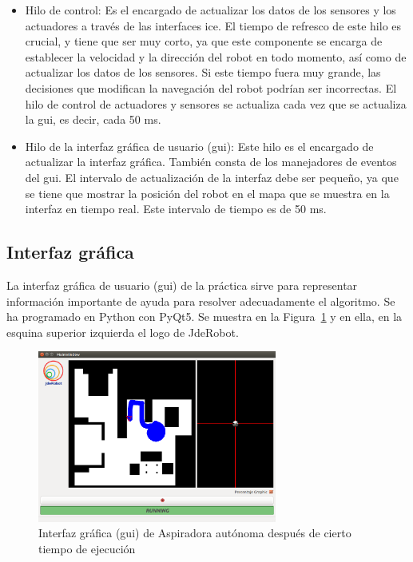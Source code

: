 \begin{itemize}
\item Hilo de control: Es el encargado de actualizar los datos de los sensores y los actuadores a través de las interfaces \acrshort{ice}. El tiempo de refresco de este hilo es crucial, y tiene que ser muy corto, ya que este componente se encarga de establecer la velocidad y la dirección del robot en todo momento, así como de actualizar los datos de los sensores. Si este tiempo fuera muy grande, las decisiones que modifican la navegación del robot podrían ser incorrectas. El hilo de control de actuadores y sensores se actualiza cada vez que se actualiza la \acrshort{gui}, es decir, cada 50 ms.

\item	Hilo de la interfaz gráfica de usuario (\acrshort{gui}): Este hilo es el encargado de actualizar la interfaz gráfica. También consta de los manejadores de eventos del \acrshort{gui}. El intervalo de actualización de la interfaz debe ser pequeño, ya que se tiene que mostrar la posición del robot en el mapa que se muestra en la interfaz en tiempo real. Este intervalo de tiempo es de 50 ms.

\end{itemize}


\subsection{Interfaz gráfica}
La interfaz gráfica de usuario (\acrshort{gui}) de la práctica sirve para representar información importante de ayuda para resolver adecuadamente el algoritmo. Se ha programado en Python con PyQt5. Se muestra en la Figura~\ref{fig.GUI2} y en ella, en la esquina superior izquierda el logo de JdeRobot. \\

\begin{figure}[H]
  \begin{center}
    \includegraphics[width=0.7\textwidth]{figures/Vacuum/GUI2.png}
		\caption{Interfaz gráfica (\acrshort{gui}) de Aspiradora autónoma después de cierto tiempo de ejecución}
		\label{fig.GUI2}
		\end{center}
\end{figure}


